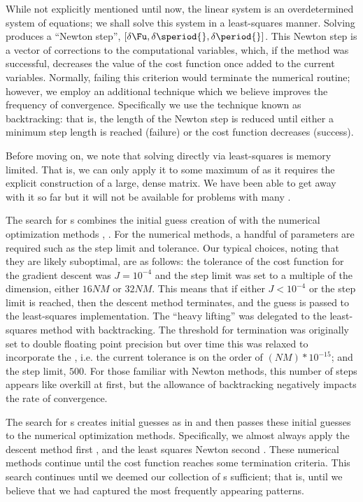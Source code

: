 While not explicitly mentioned
until now, the linear system  is an overdetermined system of equations; we shall
solve this system in a least-squares manner.
Solving  produces a ``Newton step'', $[\delta\Fu, \delta \speriod{}, \delta \period{}]$.
This Newton step is a vector of corrections to the computational variables, which,
if the method was successful, decreases the value of the cost function once added to the
current variables. Normally, failing this criterion would terminate the numerical routine;
however, we employ an additional technique which we believe improves the frequency of convergence.
Specifically we use the technique known as backtracking: %
that is, the length of the Newton step is reduced until either a minimum step
length is reached (failure) or the cost function decreases (success).

Before moving on, we note that solving  directly via
least-squares is memory limited. That is, we can only apply it to some
maximum of {\cdofs} as it requires
the explicit construction of a large, dense matrix. We have
been able to get away with it so far but it will not be available
for problems with many {\cdofs}.

The search for {\po}s combines the initial guess creation of 
with the numerical optimization methods , .
For the numerical methods, a handful of parameters are required such as the step limit
and tolerance. Our typical choices, noting that they are likely suboptimal, are as follows:
the tolerance of the cost function for the gradient descent was $J = 10^{-4}$
and the step limit was set to a multiple of the dimension, either $16NM$ or $32NM$.
This means that if either  $J < 10^{-4}$ or the step limit
is reached, then the descent method terminates, and the guess is passed to the
least-squares implementation.
The ``heavy lifting'' was delegated to the least-squares method
with backtracking. The threshold for termination was originally set to double
floating point precision but over time this was relaxed to incorporate the {\cdof}, i.e.
the current tolerance is on the order of $(NM)*10^{-15}$; and the step limit, $500$.
For those familiar with Newton methods, this number of steps appears like overkill at first, but the
allowance of backtracking negatively impacts the rate of convergence.

The search for {\po}s creates initial guesses as in 
and then passes these initial guesses to the numerical optimization methods.
Specifically, we almost always apply the descent method first ,
and the least squares Newton second . These numerical methods
continue until the cost function  reaches some termination criteria.
This search continues until we deemed our collection of {\po}s sufficient; that is,
until we believe that we had captured the most frequently appearing {\spt} patterns.


